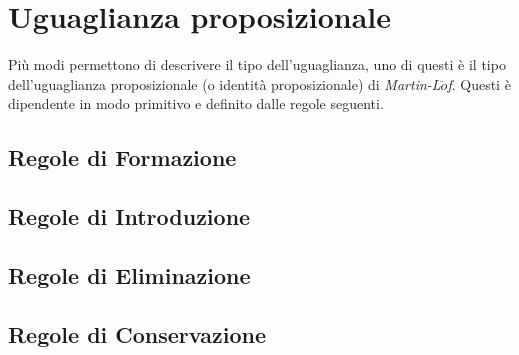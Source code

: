\chapter{Uguaglianza proposizionale}
\label{cap: uguaglianza-proposizionale}
Pi\`u modi permettono di descrivere il tipo dell'uguaglianza, uno di questi \`e il tipo dell'uguaglianza proposizionale (o identit\`a proposizionale) di \textit{Martin-L$\ddot{o}$f}. Questi \`e dipendente in modo primitivo e definito dalle regole seguenti.

\section{Regole di Formazione}
\label{subsec: formazione-id}
\begin{prooftree}
\end{prooftree}

\section{Regole di Introduzione}
\label{subsec: introduzione-id}
\begin{prooftree}
\end{prooftree}

\section{Regole di Eliminazione}
\label{subsec: eliminazione-id}
\small
\begin{prooftree}
\end{prooftree}

\section{Regole di Conservazione}
\label{subsec: conservazione-id}
\small
\begin{prooftree}
\end{prooftree}


